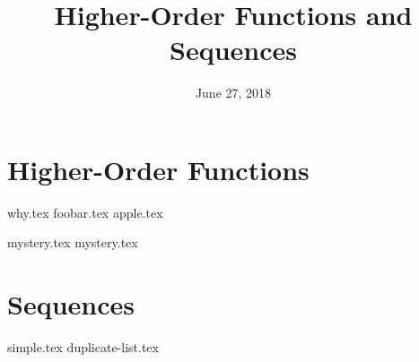 \documentclass{exam}
\title{Higher-Order Functions and Sequences}
\date{June 27, 2018}
\begin{document}
\maketitle

\section{Higher-Order Functions}
\begin{questions}
{why.tex}
{foobar.tex}
{apple.tex}
\clearpage

{mystery.tex}
{mystery.tex}
\clearpage

\section{Sequences}
{simple.tex}
{duplicate-list.tex}

\end{questions}
\end{document}
